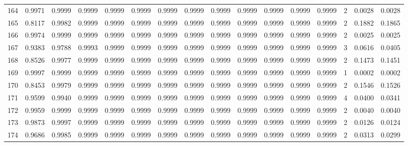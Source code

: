 \begin{tabular}{lrrrrrrrrrrrrrrr}
164 &      0.9971 &  0.9999 &  0.9999 &  0.9999 &  0.9999 &  0.9999 &  0.9999 &  0.9999 &  0.9999 &  0.9999 &   0.9999 &     0.9999 &      2 &                    0.0028 &                     0.0028 \\
165 &      0.8117 &  0.9982 &  0.9999 &  0.9999 &  0.9999 &  0.9999 &  0.9999 &  0.9999 &  0.9999 &  0.9999 &   0.9999 &     0.9999 &      2 &                    0.1882 &                     0.1865 \\
166 &      0.9974 &  0.9999 &  0.9999 &  0.9999 &  0.9999 &  0.9999 &  0.9999 &  0.9999 &  0.9999 &  0.9999 &   0.9999 &     0.9999 &      2 &                    0.0025 &                     0.0025 \\
167 &      0.9383 &  0.9788 &  0.9993 &  0.9999 &  0.9999 &  0.9999 &  0.9999 &  0.9999 &  0.9999 &  0.9999 &   0.9999 &     0.9999 &      3 &                    0.0616 &                     0.0405 \\
168 &      0.8526 &  0.9977 &  0.9999 &  0.9999 &  0.9999 &  0.9999 &  0.9999 &  0.9999 &  0.9999 &  0.9999 &   0.9999 &     0.9999 &      2 &                    0.1473 &                     0.1451 \\
169 &      0.9997 &  0.9999 &  0.9999 &  0.9999 &  0.9999 &  0.9999 &  0.9999 &  0.9999 &  0.9999 &  0.9999 &   0.9999 &     0.9999 &      1 &                    0.0002 &                     0.0002 \\
170 &      0.8453 &  0.9979 &  0.9999 &  0.9999 &  0.9999 &  0.9999 &  0.9999 &  0.9999 &  0.9999 &  0.9999 &   0.9999 &     0.9999 &      2 &                    0.1546 &                     0.1526 \\
171 &      0.9599 &  0.9940 &  0.9999 &  0.9999 &  0.9999 &  0.9999 &  0.9999 &  0.9999 &  0.9999 &  0.9999 &   0.9999 &     0.9999 &      4 &                    0.0400 &                     0.0341 \\
172 &      0.9959 &  0.9999 &  0.9999 &  0.9999 &  0.9999 &  0.9999 &  0.9999 &  0.9999 &  0.9999 &  0.9999 &   0.9999 &     0.9999 &      2 &                    0.0040 &                     0.0040 \\
173 &      0.9873 &  0.9997 &  0.9999 &  0.9999 &  0.9999 &  0.9999 &  0.9999 &  0.9999 &  0.9999 &  0.9999 &   0.9999 &     0.9999 &      2 &                    0.0126 &                     0.0124 \\
174 &      0.9686 &  0.9985 &  0.9999 &  0.9999 &  0.9999 &  0.9999 &  0.9999 &  0.9999 &  0.9999 &  0.9999 &   0.9999 &     0.9999 &      2 &                    0.0313 &                     0.0299 \\

\end{tabular}
